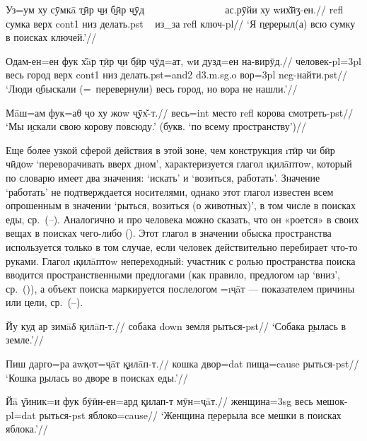 \begingl
\gla Уз=ум ху сӯмкā \b{тӣр} \b{чи} \b{бӣр} \b{чӯд} ~~~~~~~~~~~~~~~ ас.рӯйи ху wих̌ӣӡ-ен.//
 {\sc refl} сумка верх {\sc cont1} низ делать.{\sc pst} ~ из\_за {\sc refl} ключ-{\sc pl}//
\glft ‘Я \b{перерыл(а)} всю сумку в поисках ключей.’//
\endgl \xe

\begingl
\gla {}Одам-ен=ен фук х̌āр \b{тӣр} \b{чи} \b{бӣр} \b{чӯд}=ат, wи дузд=ен на-вирӯд.//
\glc человек-{\sc pl=3pl} весь город верх {\sc cont1} низ делать.{\sc pst=and2} {\sc d3.m.sg.o} вор={\sc 3pl} {\sc neg}-найти.{\sc pst}//
\glft ‘Люди \b{обыскали} (=~перевернули) весь город, но вора не нашли.’//
\endgl \xe

\begingl
\gla Мāш=ам фук=аθ ҷо ху жоw \b{чӯх̌-т}.//
 весь={\sc int} место {\sc refl} корова смотреть-{\sc pst}//
\glft ‘Мы \b{искали} свою корову повсюду.’ (букв. ‘по всему пространству’)//
\endgl \xe

Еще более узкой сферой действия в этой зоне, чем конструкция \i{тӣр чи бӣр чӣдоw} ‘переворачивать вверх дном’, характеризуется глагол \i{қилāптоw}, который по словарю \parencite{karamshoev1999} имеет два значения: ‘искать’ и ‘возиться, работать’. Значение ‘работать’ не подтверждается носителями, однако этот глагол известен всем опрошенным в значении ‘рыться, возиться (о животных)’, в том числе в поисках еды, ср.~(–). Аналогично и про человека можно сказать, что он «роется» в своих вещах в поисках чего-либо (). Этот глагол в значении обыска пространства используется только в том случае, если человек действительно перебирает что-то руками. Глагол \i{қилāптоw} непереходный: участник с ролью пространства поиска вводится пространственными предлогами (как правило, предлогом \i{ар} ‘вниз’, ср.~()), а объект поиска маркируется послелогом =\i{ҷāт} — показателем причины или цели, ср.~(–).

\begingl
\gla Йу куд ар зимāδ \b{қилāп-т}.//
 собака {\sc down} земля рыться-{\sc pst}//
\glft ‘Собака \b{рылась} в земле.’//
\endgl \xe

\begingl
\gla Пиш дарго=ра аwқот=ҷāт \b{қилāп-т}.//
\glc кошка двор={\sc dat} пища={\sc cause} рыться-{\sc pst}//
\glft ‘Кошка \b{рылась} во дворе в поисках еды.’//
\endgl \xe

\begingl
\gla Йā ɣ̌иник=и фук бӯӣн-ен=ард \b{қилап-т} мӯн=ҷāт.//
 женщина={\sc 3sg} весь мешок-{\sc pl=dat} рыться-{\sc pst} яблоко={\sc cause}//
\glft ‘Женщина \b{перерыла} все мешки в поисках яблока.’//
\endgl \xe


